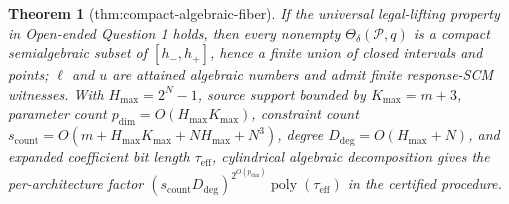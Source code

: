 \documentclass{article}
\newtheorem{theorem}{Theorem}
\begin{document}
\begin{theorem}[thm:compact-algebraic-fiber]\label{thm:compact-algebraic-fiber}
If the universal legal-lifting property in Open-ended Question 1 holds, then every nonempty \(\Theta_\delta(\mathcal P,q)\) is a compact semialgebraic subset of \([h_-,h_+]\), hence a finite union of closed intervals and points; \(\ell\) and \(u\) are attained algebraic numbers and admit finite response-SCM witnesses. With \(H_{\max}=2^N-1\), source support bounded by \(K_{\max}=m+3\), parameter count \(p_{\mathrm{dim}}=O(H_{\max}K_{\max})\), constraint count \(s_{\mathrm{count}}=O(m+H_{\max}K_{\max}+NH_{\max}+N^3)\), degree \(D_{\mathrm{deg}}=O(H_{\max}+N)\), and expanded coefficient bit length \(\tau_{\mathrm{eff}}\), cylindrical algebraic decomposition gives the per-architecture factor \((s_{\mathrm{count}}D_{\mathrm{deg}})^{2^{O(p_{\mathrm{dim}})}}\operatorname{poly}(\tau_{\mathrm{eff}})\) in the certified procedure.
\end{theorem}
\end{document}
